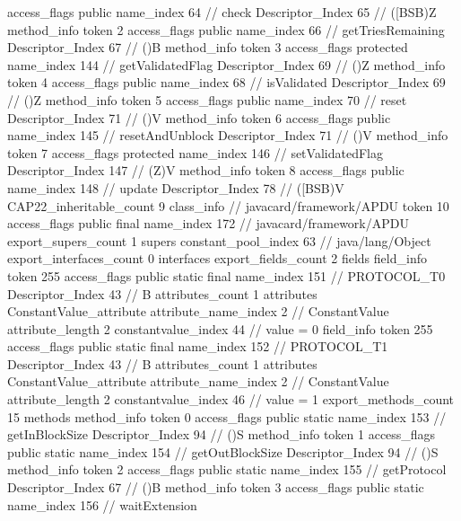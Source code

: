 {{{{{					access_flags	public
					name_index	64		// check
					Descriptor_Index	65		// ([BSB)Z
				}
				method_info {
					token	2
					access_flags	public
					name_index	66		// getTriesRemaining
					Descriptor_Index	67		// ()B
				}
				method_info {
					token	3
					access_flags	protected
					name_index	144		// getValidatedFlag
					Descriptor_Index	69		// ()Z
				}
				method_info {
					token	4
					access_flags	public
					name_index	68		// isValidated
					Descriptor_Index	69		// ()Z
				}
				method_info {
					token	5
					access_flags	public
					name_index	70		// reset
					Descriptor_Index	71		// ()V
				}
				method_info {
					token	6
					access_flags	public
					name_index	145		// resetAndUnblock
					Descriptor_Index	71		// ()V
				}
				method_info {
					token	7
					access_flags	protected
					name_index	146		// setValidatedFlag
					Descriptor_Index	147		// (Z)V
				}
				method_info {
					token	8
					access_flags	public
					name_index	148		// update
					Descriptor_Index	78		// ([BSB)V
				}
			}
			CAP22_inheritable_count	9
		}
		class_info {		// javacard/framework/APDU
			token	10
			access_flags	public final
			name_index	172		// javacard/framework/APDU
			export_supers_count	1
			supers {
				constant_pool_index	63		// java/lang/Object
			}
			export_interfaces_count	0
			interfaces {
			}
			export_fields_count	2
			fields {
			field_info {
				token	255
				access_flags	public static final
				name_index	151		// PROTOCOL_T0
				Descriptor_Index	43		// B
				attributes_count	1
				attributes {
				ConstantValue_attribute {
					attribute_name_index	2		// ConstantValue
					attribute_length	2
					constantvalue_index	44		// value = 0
				}
				}
			}
			field_info {
				token	255
				access_flags	public static final
				name_index	152		// PROTOCOL_T1
				Descriptor_Index	43		// B
				attributes_count	1
				attributes {
				ConstantValue_attribute {
					attribute_name_index	2		// ConstantValue
					attribute_length	2
					constantvalue_index	46		// value = 1
				}
				}
			}
			}
			export_methods_count	15
			methods {
				method_info {
					token	0
					access_flags	public static
					name_index	153		// getInBlockSize
					Descriptor_Index	94		// ()S
				}
				method_info {
					token	1
					access_flags	public static
					name_index	154		// getOutBlockSize
					Descriptor_Index	94		// ()S
				}
				method_info {
					token	2
					access_flags	public static
					name_index	155		// getProtocol
					Descriptor_Index	67		// ()B
				}
				method_info {
					token	3
					access_flags	public static
					name_index	156		// waitExtension
}}}}}
